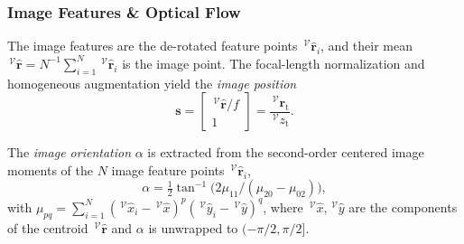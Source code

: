 \documentclass{IEEEtaes}
\begin{document}
\subsubsection{Image Features \& Optical Flow} \label{image features: section}
The image features are the de-rotated feature points $\,^\mathcal{V}\hat{\boldsymbol{r}}_i$, and their mean $\,^\mathcal{V}\hat{\boldsymbol{r}}=N^{-1}\sum_{i=1}^{N}\,^\mathcal{V}\hat{\boldsymbol{r}}_i$ is the image point. The focal-length normalization and homogeneous augmentation yield the \emph{image position}
\begin{equation} \label{image position: equation}
    \boldsymbol{s} = \begin{bmatrix}\,^\mathcal{V}\hat{\boldsymbol{r}}/f\\ 1\end{bmatrix} = \frac{\,^\mathcal{V}\boldsymbol{r}_\text{t}}{\,^\mathcal{V}z_\text{t}}.
\end{equation}

The \emph{image orientation} $\alpha$ is extracted from the second-order centered image moments of the $N$ image feature points $\,^\mathcal{V}\hat{\boldsymbol{r}}_i$,
\begin{equation} \label{image orientation: equation}
    \alpha = \tfrac12\tan^{-1}\!\big(2\mu_{11}/(\mu_{20}-\mu_{02})\big),
\end{equation}
with $\mu_{pq} = \sum_{i=1}^{N}(\,^\mathcal{V}\hat{x}_i - \,^\mathcal{V}\hat{x})^p(\,^\mathcal{V}\hat{y}_i - \,^\mathcal{V}\hat{y})^q$, where $\,^\mathcal{V}\hat{x},\,^\mathcal{V}\hat{y}$ are the components of the centroid $\,^\mathcal{V}\hat{\boldsymbol{r}}$ and $\alpha$ is unwrapped to $(-\pi/2,\pi/2]$.
\end{document}
